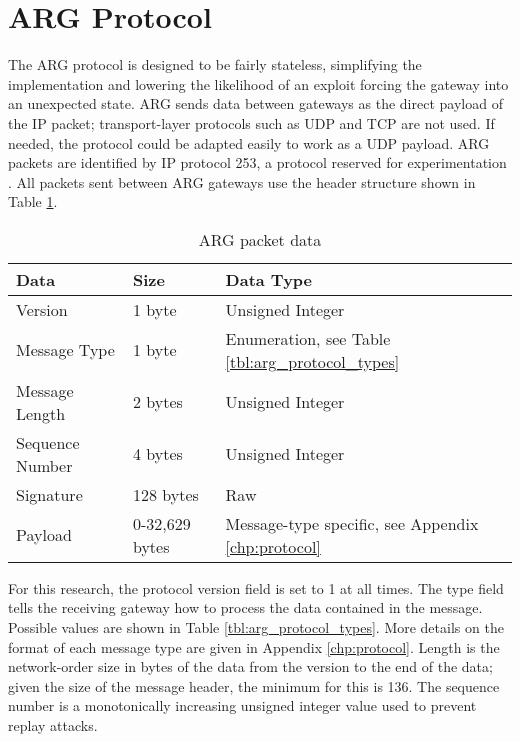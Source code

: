 \section{\ac{ARG} Protocol}
\label{sec:arg_protocol}
\par The \ac{ARG} protocol is designed to be fairly stateless, simplifying the implementation and lowering the likelihood of an exploit forcing the gateway into an unexpected state. \ac{ARG} sends data between gateways as the direct payload of the \ac{IP} packet; transport-layer protocols such as \ac{UDP} and \ac{TCP} are not used. If needed, the protocol could be adapted easily to work as a \ac{UDP} payload. \ac{ARG} packets are identified by \ac{IP} protocol 253, a protocol reserved for experimentation \cite{rfc3692}. All packets sent between \ac{ARG} gateways use the header structure shown in Table \ref{tab:arg_packet_structure}.

\begin{table}
\caption{\ac{ARG} packet data}
\label{tab:arg_packet_structure}
\centering
\begin{tabular}{l|l|l}
\textbf{Data} & \textbf{Size} & \textbf{Data Type}\\
\hline
Version & 1 byte & Unsigned Integer\\
Message Type & 1 byte & Enumeration, see Table \ref{tbl:arg_protocol_types}\\
Message Length & 2 bytes & Unsigned Integer\\
Sequence Number & 4 bytes & Unsigned Integer\\
Signature & 128 bytes & Raw\\
Payload & 0-32,629 bytes & Message-type specific, see Appendix \ref{chp:protocol}
\end{tabular}
\end{table}

\par For this research, the protocol version field is set to 1 at all times. The type field tells the receiving gateway how to process the data contained in the message. Possible values are shown in Table \ref{tbl:arg_protocol_types}. More details on the format of each message type are given in Appendix \ref{chp:protocol}. Length is the network-order size in bytes of the data from the version to the end of the data; given the size of the message header, the minimum for this is 136. The sequence number is a monotonically increasing unsigned integer value used to prevent replay attacks.

